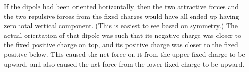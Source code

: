 If the dipole had been oriented horizontally, then the two attractive
forces and the two repulsive forces from the fixed charges would have 
all ended up having zero total vertical component.
(This is easiest to see based on symmetry.)
The actual orientation of that dipole was such that its negative charge
was closer to the fixed positive charge on top, and its
positive charge was closer to the fixed positive below.
This caused the net force on it from the upper fixed charge to
be upward, and also caused the net force from the lower fixed charge
to be upward.
